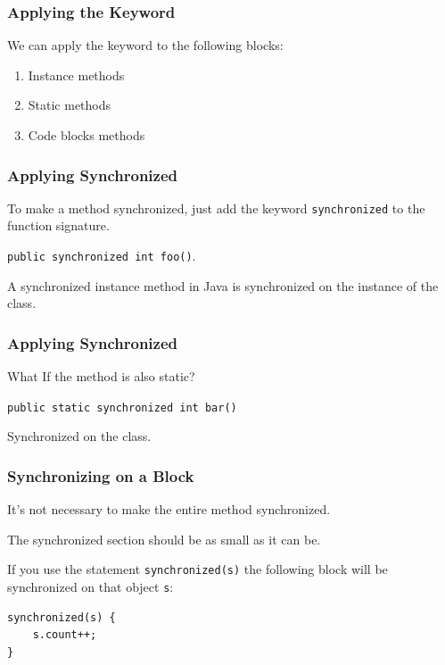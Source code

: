 \begin{frame}
\frametitle{Applying the Keyword}
\begin{changemargin}{1cm}

We can apply the keyword to the following blocks:
\begin{enumerate}
	\item Instance methods
	\item Static methods
	\item Code blocks methods
\end{enumerate}

\end{changemargin}
\end{frame}

\begin{frame}
\frametitle{Applying Synchronized}
\begin{changemargin}{1cm}

To make a method synchronized, just add the keyword \texttt{synchronized} to the function signature.

\texttt{public synchronized int foo()}.

A synchronized instance method in Java is synchronized on the instance of the class.

\end{changemargin}
\end{frame}

\begin{frame}
\frametitle{Applying Synchronized}
\begin{changemargin}{1cm}

What If the method is also static?

\texttt{public static synchronized int bar()}

Synchronized on the class.

\end{changemargin}
\end{frame}

\begin{frame}[fragile]
\frametitle{Synchronizing on a Block}
\begin{changemargin}{1cm}

It's not necessary to make the entire method synchronized.

The synchronized section should be as small as it can be.

If you use the statement \texttt{synchronized(s)} the following block will be synchronized on that object \texttt{s}:
\begin{verbatim}
synchronized(s) {
    s.count++;
}
\end{verbatim}

\end{changemargin}
\end{frame}

